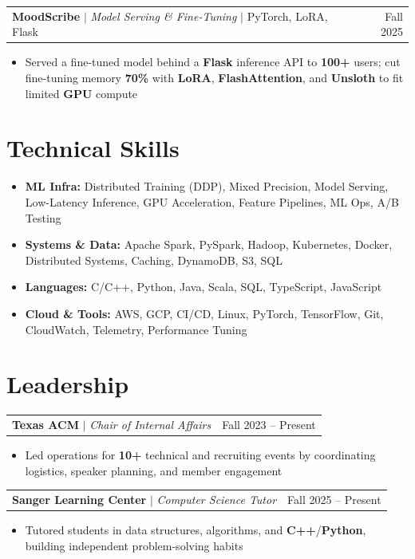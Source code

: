 \documentclass[letterpaper,10pt]{article}
\makeatletter
\newcommand{\resumeWorkHeading}[2]{%
  \vspace{2pt}\noindent
  \begin{tabular*}{\textwidth}{@{}l@{\extracolsep{\fill}}r@{}}
    #1 & #2 \\
  \end{tabular*}%
  \vspace{-2pt}
}
\newcommand{\resumeItemListStart}{\begin{itemize}}
\newcommand{\resumeItemListEnd}{\end{itemize}\vspace{3pt}}
\newcommand{\resumeItem}[1]{\item #1}
\makeatother
\begin{document}
\resumeWorkHeading
{\textbf{MoodScribe} $|$ \emph{Model Serving \& Fine-Tuning} $|$ PyTorch, LoRA, Flask}{Fall 2025}
\resumeItemListStart
\resumeItem{Served a fine-tuned model behind a \textbf{Flask} inference API to \textbf{100+} users; cut fine-tuning memory \textbf{70\%} with \textbf{LoRA}, \textbf{FlashAttention}, and \textbf{Unsloth} to fit limited \textbf{GPU} compute}
\resumeItemListEnd

\section{Technical Skills}
\begin{itemize}[leftmargin=0em,label={},itemsep=1pt,parsep=0pt,topsep=2pt]
\item \textbf{ML Infra:} Distributed Training (DDP), Mixed Precision, Model Serving, Low-Latency Inference, GPU Acceleration, Feature Pipelines, ML Ops, A/B Testing
\item \textbf{Systems \& Data:} Apache Spark, PySpark, Hadoop, Kubernetes, Docker, Distributed Systems, Caching, DynamoDB, S3, SQL
\item \textbf{Languages:} C/C++, Python, Java, Scala, SQL, TypeScript, JavaScript
\item \textbf{Cloud \& Tools:} AWS, GCP, CI/CD, Linux, PyTorch, TensorFlow, Git, CloudWatch, Telemetry, Performance Tuning
\end{itemize}

\section{Leadership}
\resumeWorkHeading
{\textbf{Texas ACM} $|$ \emph{Chair of Internal Affairs}}{Fall 2023 -- Present}
\resumeItemListStart
\resumeItem{Led operations for \textbf{10+} technical and recruiting events by coordinating logistics, speaker planning, and member engagement}
\resumeItemListEnd

\resumeWorkHeading
{\textbf{Sanger Learning Center} $|$ \emph{Computer Science Tutor}}{Fall 2025 -- Present}
\resumeItemListStart
\resumeItem{Tutored students in data structures, algorithms, and \textbf{C++}/\textbf{Python}, building independent problem-solving habits}
\resumeItemListEnd
\end{document}
